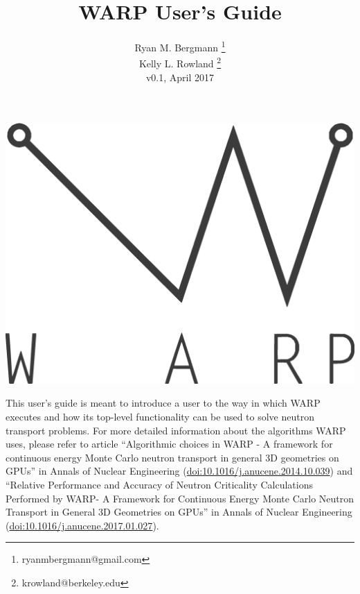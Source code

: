 \documentclass[twoside,a4paper]{refart}
\title{WARP User's Guide}
\author{Ryan M. Bergmann \thanks{ryanmbergmann@gmail.com} \\
Kelly L. Rowland \thanks{krowland@berkeley.edu}\\
v0.1,  April 2017}
\date{}
\begin{document}
\maketitle

%
%

\includegraphics[width=\linewidth]{graphics/warp-vec.eps}

\vspace*{\fill} %

This user's guide is meant to introduce a user to the way in which WARP executes and how its top-level 
functionality can be used to solve neutron transport problems.  For more detailed information about the 
algorithms WARP uses, please refer to article ``Algorithmic choices in WARP - A framework for continuous 
energy Monte Carlo neutron transport in general 3D geometries on GPUs'' in Annals of Nuclear Engineering 
(\href{http://dx.doi.org/10.1016/j.anucene.2014.10.039}{doi:10.1016/j.anucene.2014.10.039}) and ``Relative Performance and Accuracy of Neutron Criticality Calculations Performed by WARP- A Framework for Continuous Energy Monte Carlo Neutron Transport in General 3D Geometries on GPUs'' in Annals of Nuclear Engineering (\href{http://dx.doi.org/10.1016/j.anucene.2017.01.027}{doi:10.1016/j.anucene.2017.01.027}).

\vfill

\newpage
\tableofcontents
\newpage


\end{document}

